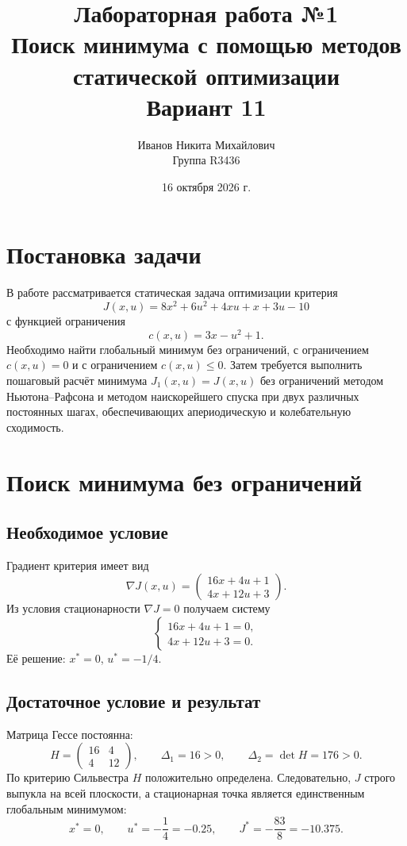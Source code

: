 \documentclass[12pt,a4paper]{article}
\title{Лабораторная работа №1\\Поиск минимума с помощью методов статической оптимизации\\Вариант 11}
\author{Иванов Никита Михайлович\\Группа R3436}
\date{16 октября 2026 г.}
\begin{document}
\maketitle
\newpage
\tableofcontents
\newpage

\section{Постановка задачи}
В работе рассматривается статическая задача оптимизации критерия
\begin{equation}
J(x,u)=8x^2+6u^2+4xu+x+3u-10
\end{equation}
с функцией ограничения
\begin{equation}
c(x,u)=3x-u^2+1.
\end{equation}
Необходимо найти глобальный минимум без ограничений, с ограничением
$c(x,u)=0$ и с ограничением $c(x,u)\leq0$. Затем требуется выполнить
пошаговый расчёт минимума $J_1(x,u)=J(x,u)$ без ограничений методом
Ньютона--Рафсона и методом наискорейшего спуска при двух различных
постоянных шагах, обеспечивающих апериодическую и колебательную сходимость.

\section{Поиск минимума без ограничений}
\subsection{Необходимое условие}
Градиент критерия имеет вид
\[
\nabla J(x,u)=
\begin{pmatrix}16x+4u+1\\4x+12u+3\end{pmatrix}.
\]
Из условия стационарности $\nabla J=0$ получаем систему
\[
\begin{cases}
16x+4u+1=0,\\
4x+12u+3=0.
\end{cases}
\]
Её решение: $x^*=0$, $u^*=-1/4$.

\subsection{Достаточное условие и результат}
Матрица Гессе постоянна:
\[
H=\begin{pmatrix}16&4\\4&12\end{pmatrix},\qquad
\Delta_1=16>0,\qquad \Delta_2=\det H=176>0.
\]
По критерию Сильвестра $H$ положительно определена. Следовательно,
$J$ строго выпукла на всей плоскости, а стационарная точка является
единственным глобальным минимумом:
\begin{equation}
x^*=0,\qquad u^*=-\frac14=-0.25,\qquad
J^*=-\frac{83}{8}=-10.375.
\end{equation}
\newpage
\end{document}
